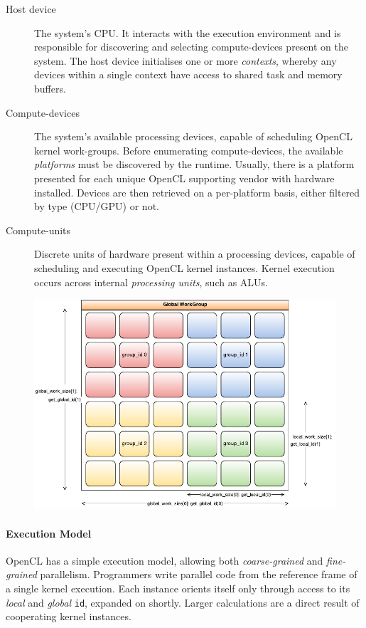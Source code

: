 \begin{description}
\item[Host device] The system's \ac{CPU}. It interacts with the execution environment and is responsible for discovering and selecting compute-devices present on the system. The host device initialises one or more \emph{contexts}, whereby any devices within a single context have access to shared task and memory buffers.

\item[Compute-devices] The system's available processing devices, capable of scheduling \ac{OpenCL} kernel work-groups. Before enumerating compute-devices, the available \emph{platforms} must be discovered by the runtime. Usually, there is a platform presented for each unique \ac{OpenCL} supporting vendor with hardware installed. Devices are then retrieved on a per-platform basis, either filtered by type (\ac{CPU}/\ac{GPU}) or not.

\item[Compute-units] Discrete units of hardware present within a processing devices, capable of scheduling and executing \ac{OpenCL} kernel instances.
Kernel execution occurs across internal \emph{processing units}, such as \acp{ALU}.
\end{description}

\begin{figure}[h]
	\includegraphics[width=\textwidth]{./figures/workgroups}
	\label{fig:ocl_ex_model}
\end{figure}

\paragraph*{Execution Model}
\ac{OpenCL} has a simple execution model, allowing both \emph{coarse-grained} and \emph{fine-grained} parallelism. Programmers write parallel code from the reference frame of a single kernel execution. Each instance orients itself only through access to its \emph{local} and \emph{global} \verb|id|, expanded on shortly. Larger calculations are a direct result of cooperating kernel instances. 

